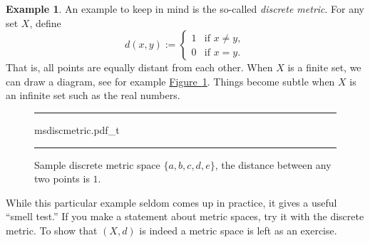 \documentclass[12pt]{book}
\newenvironment{myfigureht}{%
\begin{figure}[h!t]
\noindent\rule{\textwidth}{0.4pt}\vspace{12pt}\par\centering}%
{\par\noindent\rule{\textwidth}{0.4pt}
\end{figure}}
\newcommand{\myindex}[1]{#1\index{#1}}
\theoremstyle{plain}
\theoremstyle{remark}
\theoremstyle{definition}
\theoremstyle{exercise}
\theoremstyle{example}
\newtheorem{example}[thm]{Example}
\newcommand{\figureref}[1]{\hyperref[#1]{Figure~\ref*{#1}}}
\begin{document}
\begin{example}
An example to keep in mind is the so-called \emph{\myindex{discrete
metric}}.
For any set $X$, define
\begin{equation*}
d(x,y) :=
\begin{cases}
1 & \text{if $x \not= y$}, \\
0 & \text{if $x = y$}.
\end{cases}
\end{equation*}
That is, all points are equally distant from each other.  When $X$ is a
finite set, we can draw a diagram, see for example
\figureref{fig:msdiscmetric}.
Things become subtle when $X$ is an infinite set such
as the real numbers.
\begin{myfigureht}
{msdiscmetric.pdf_t}
\caption{Sample discrete metric space $\{ a,b,c,d,e \}$, the distance
between any two points is $1$.\label{fig:msdiscmetric}}
\end{myfigureht}

While this particular
example seldom comes up in practice, it gives a useful 
``smell test.''  If you make a statement about metric spaces,
try it with the discrete metric.
To show that $(X,d)$ is indeed a metric space is left as an exercise.
\end{example}
\end{document}
